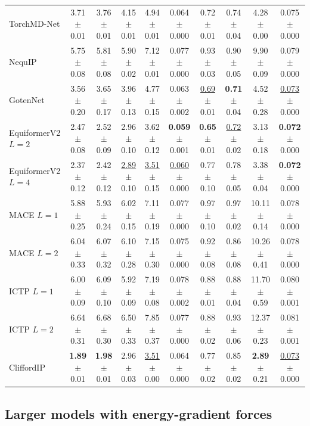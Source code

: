 \begin{table}[t]
{\begin{tabular}{lccccccccc}
TorchMD-Net & 3.71 $\pm$ 0.01 & 3.76 $\pm$ 0.01 & 4.15 $\pm$ 0.01 & 4.94 $\pm$ 0.01 & 0.064 $\pm$ 0.000 & 0.72 $\pm$ 0.01 & 0.74 $\pm$ 0.04 & 4.28 $\pm$ 0.00 & 0.075 $\pm$ 0.000 \\
NequIP & 5.75 $\pm$ 0.08 & 5.81 $\pm$ 0.08 & 5.90 $\pm$ 0.02 & 7.12 $\pm$ 0.01 & 0.077 $\pm$ 0.000 & 0.93 $\pm$ 0.03 & 0.90 $\pm$ 0.05 & 9.90 $\pm$ 0.09 & 0.079 $\pm$ 0.000 \\
GotenNet & 3.56 $\pm$ 0.20 & 3.65 $\pm$ 0.17 & 3.96 $\pm$ 0.13 & 4.77 $\pm$ 0.15 & 0.063 $\pm$ 0.002 & \underline{0.69} $\pm$ 0.01 & \textbf{0.71} $\pm$ 0.04 & 4.52 $\pm$ 0.28 & \underline{0.073} $\pm$ 0.000 \\
EquiformerV2 $L{=}2$ & 2.47 $\pm$ 0.08 & 2.52 $\pm$ 0.09 & 2.96 $\pm$ 0.10 & 3.62 $\pm$ 0.12 & \textbf{0.059} $\pm$ 0.001 & \textbf{0.65} $\pm$ 0.01 & \underline{0.72} $\pm$ 0.02 & 3.13 $\pm$ 0.18 & \textbf{0.072} $\pm$ 0.000 \\
EquiformerV2 $L{=}4$ & 2.37 $\pm$ 0.12 & 2.42 $\pm$ 0.12 & \underline{2.89} $\pm$ 0.10 & \underline{3.51} $\pm$ 0.15 & \underline{0.060} $\pm$ 0.000 & 0.77 $\pm$ 0.10 & 0.78 $\pm$ 0.05 & 3.38 $\pm$ 0.04 & \textbf{0.072} $\pm$ 0.000 \\
MACE $L{=}1$ & 5.88 $\pm$ 0.25 & 5.93 $\pm$ 0.24 & 6.02 $\pm$ 0.15 & 7.11 $\pm$ 0.19 & 0.077 $\pm$ 0.000 & 0.97 $\pm$ 0.10 & 0.97 $\pm$ 0.02 & 10.11 $\pm$ 0.14 & 0.078 $\pm$ 0.000 \\
MACE $L{=}2$ & 6.04 $\pm$ 0.33 & 6.07 $\pm$ 0.32 & 6.10 $\pm$ 0.28 & 7.15 $\pm$ 0.30 & 0.075 $\pm$ 0.000 & 0.92 $\pm$ 0.08 & 0.86 $\pm$ 0.08 & 10.26 $\pm$ 0.41 & 0.078 $\pm$ 0.000 \\
ICTP $L{=}1$ & 6.00 $\pm$ 0.09 & 6.09 $\pm$ 0.10 & 5.92 $\pm$ 0.09 & 7.19 $\pm$ 0.08 & 0.078 $\pm$ 0.002 & 0.88 $\pm$ 0.01 & 0.88 $\pm$ 0.04 & 11.70 $\pm$ 0.59 & 0.080 $\pm$ 0.001 \\
ICTP $L{=}2$ & 6.64 $\pm$ 0.31 & 6.68 $\pm$ 0.30 & 6.50 $\pm$ 0.33 & 7.85 $\pm$ 0.37 & 0.077 $\pm$ 0.000 & 0.88 $\pm$ 0.02 & 0.93 $\pm$ 0.06 & 12.37 $\pm$ 0.23 & 0.081 $\pm$ 0.001 \\
CliffordIP & \textbf{1.89} $\pm$ 0.01 & \textbf{1.98} $\pm$ 0.01 & 2.96 $\pm$ 0.03 & \underline{3.51} $\pm$ 0.00 & 0.064 $\pm$ 0.000 & 0.77 $\pm$ 0.02 & 0.85 $\pm$ 0.02 & \textbf{2.89} $\pm$ 0.21 & \underline{0.073} $\pm$ 0.000 \\
\bottomrule
\end{tabular}%
}
\end{table}

\subsection{Larger models with energy-gradient forces}\label{sec:seeds}

